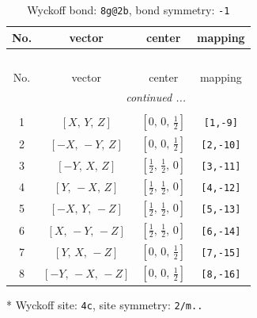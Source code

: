 \documentclass[fleqn,8pt]{jsarticle}
\begin{document}
\renewcommand{\arraystretch}{1.2}
\begin{longtable}{cccc}
\caption{Wyckoff bond: {\tt 8g@2b}, bond symmetry: {\tt -1}}
 \\
 \hline \hline
No. & vector & center & mapping \\ \hline \endfirsthead

\multicolumn{3}{l}{\tablename\ \thetable{}} \\
 \hline \hline
No. & vector & center & mapping \\ \hline \endhead

 \hline \hline
\multicolumn{3}{r}{\footnotesize\it continued ...} \\ \endfoot

 \hline \hline
\multicolumn{3}{r}{} \\ \endlastfoot

1 & $\left[ X,\, Y,\, Z \right]$ & $\left[ 0,\, 0,\, \frac{1}{2} \right]$ & {\tt [1,-9]} \\ \hline
2 & $\left[ - X,\, - Y,\, Z \right]$ & $\left[ 0,\, 0,\, \frac{1}{2} \right]$ & {\tt [2,-10]} \\ \hline
3 & $\left[ - Y,\, X,\, Z \right]$ & $\left[ \frac{1}{2},\, \frac{1}{2},\, 0 \right]$ & {\tt [3,-11]} \\ \hline
4 & $\left[ Y,\, - X,\, Z \right]$ & $\left[ \frac{1}{2},\, \frac{1}{2},\, 0 \right]$ & {\tt [4,-12]} \\ \hline
5 & $\left[ - X,\, Y,\, - Z \right]$ & $\left[ \frac{1}{2},\, \frac{1}{2},\, 0 \right]$ & {\tt [5,-13]} \\ \hline
6 & $\left[ X,\, - Y,\, - Z \right]$ & $\left[ \frac{1}{2},\, \frac{1}{2},\, 0 \right]$ & {\tt [6,-14]} \\ \hline
7 & $\left[ Y,\, X,\, - Z \right]$ & $\left[ 0,\, 0,\, \frac{1}{2} \right]$ & {\tt [7,-15]} \\ \hline
8 & $\left[ - Y,\, - X,\, - Z \right]$ & $\left[ 0,\, 0,\, \frac{1}{2} \right]$ & {\tt [8,-16]} \\
\end{longtable}
* Wyckoff site: {\tt 4c}, site symmetry: {\tt 2/m..}
\renewcommand{\arraystretch}{1.2}
\end{document}

